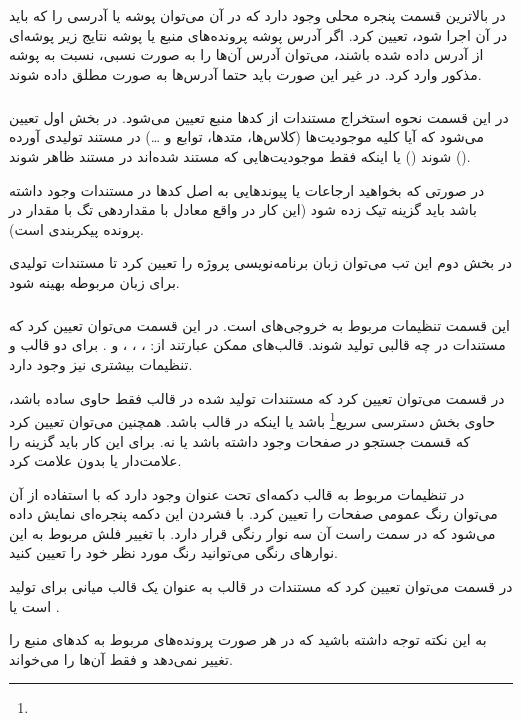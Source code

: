 در بالاترین قسمت پنجره  محلی وجود دارد که در آن می‌توان پوشه‌ یا
آدرسی را که  باید در آن اجرا شود، تعیین کرد. اگر آدرس پوشه
پرونده‌های منبع یا پوشه نتایج زیر پوشه‌ای از آدرس داده شده باشند، می‌توان آدرس
آن‌ها را به صورت نسبی، نسبت به پوشه مذکور وارد کرد. در غیر این صورت باید حتما
آدرس‌ها به صورت مطلق داده شوند.

\subparagraph{}
در این قسمت نحوه استخراج مستندات از کدها منبع تعیین می‌شود. در بخش اول تعیین
می‌شود که آیا کلیه موجودیت‌ها (کلاس‌ها، متدها، توابع و \ldots) در مستند تولیدی
آورده شوند () یا اینکه فقط موجودیت‌هایی که مستند شده‌اند در
مستند ظاهر شوند ().

در صورتی که بخواهید ارجاعات یا پیوندهایی به اصل کدها در مستندات وجود داشته باشد
باید گزینه  تیک زده شود (این کار در واقع
معادل با مقداردهی تگ  با مقدار  در پرونده پیکربندی
است).

در بخش دوم این تب می‌توان زبان برنامه‌نویسی پروژه را تعیین کرد تا مستندات تولیدی
برای زبان مربوطه بهینه شود.

\subparagraph{}
این قسمت تنظیمات مربوط به خروجی‌های  است. در این قسمت می‌توان تعیین
کرد که مستندات در چه قالبی تولید شوند. قالب‌های ممکن عبارتند از: ،
\lr{\LaTeX}، ،  و .
برای دو قالب  و \lr{\LaTeX} تنظیمات بیشتری نیز وجود دارد.

در قسمت  می‌توان تعیین کرد که مستندات تولید شده در قالب  فقط
حاوی  ساده باشد، حاوی بخش دسترسی سریع\footnote{}
باشد یا اینکه در قالب  باشد. همچنین می‌توان تعیین کرد که قسمت جستجو در
صفحات  وجود داشته باشد یا نه. برای این کار باید گزینه  را علامت‌دار یا بدون علامت کرد.

در تنظیمات مربوط به قالب  دکمه‌ای تحت عنوان 
وجود دارد که با استفاده از آن می‌توان رنگ عمومی صفحات  را تعیین کرد. با
فشردن این دکمه پنجره‌ای نمایش داده می‌شود که در سمت راست آن سه نوار رنگی قرار
دارد. با تغییر فلش مربوط به این نوارهای رنگی می‌توانید رنگ مورد نظر خود را تعیین
کنید.


در قسمت  می‌توان تعیین کرد که مستندات در قالب \lr{\LaTeX} به عنوان یک
قالب میانی برای تولید  است یا .

به این نکته توجه داشته باشید که در هر صورت  پرونده‌های مربوط به
کدهای منبع را تغییر نمی‌دهد و فقط آن‌ها را می‌خواند.

